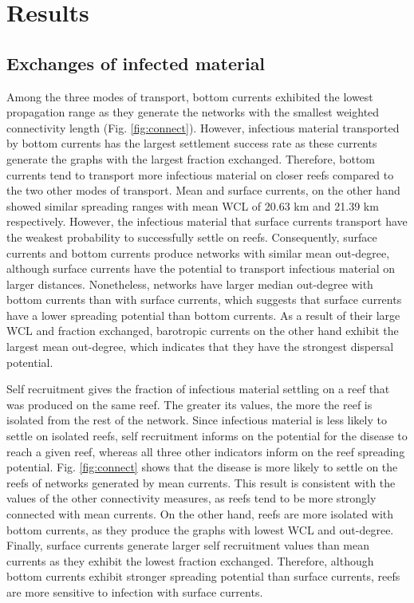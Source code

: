 \documentclass[utf8]{frontiersSCNS}
\begin{document}
\section{Results}

\subsection{Exchanges of infected material}

Among the three modes of transport, bottom currents exhibited the lowest propagation range as they generate the networks with the smallest weighted connectivity length (Fig. \ref{fig:connect}). However, infectious material transported by bottom currents has the largest settlement success rate as these currents generate the graphs with the largest fraction exchanged. Therefore, bottom currents tend to transport more infectious material on closer reefs compared to the two other modes of transport. Mean and surface currents, on the other hand showed similar spreading ranges with mean WCL of 20.63 km and 21.39 km respectively. However, the infectious material that surface currents transport have the weakest probability to successfully settle on reefs. Consequently, surface currents and bottom currents produce networks with similar mean out-degree, although surface currents have the potential to transport infectious material on larger distances. Nonetheless, networks have larger median out-degree with bottom currents than with surface currents, which suggests that surface currents have a lower spreading potential than bottom currents. As a result of their large WCL and fraction exchanged, barotropic currents on the other hand exhibit the largest mean out-degree, which indicates that they have the strongest dispersal potential. 

Self recruitment gives the fraction of infectious material settling on a reef that was produced on the same reef. The greater its values, the more the reef is isolated from the rest of the network. Since infectious material is less likely to settle on isolated reefs, self recruitment informs on the potential for the disease to reach a given reef, whereas all three other indicators inform on the reef spreading potential. Fig. \ref{fig:connect} shows that the disease is more likely to settle on the reefs of networks generated by mean currents. This result is consistent with the values of the other connectivity measures, as reefs tend to be more strongly connected with mean currents. On the other hand, reefs are more isolated with bottom currents, as they produce the graphs with lowest WCL and out-degree. Finally, surface currents generate larger self recruitment values than mean currents as they exhibit the lowest fraction exchanged. Therefore, although bottom currents exhibit stronger spreading potential than surface currents, reefs are more sensitive to infection with surface currents.
\end{document}
